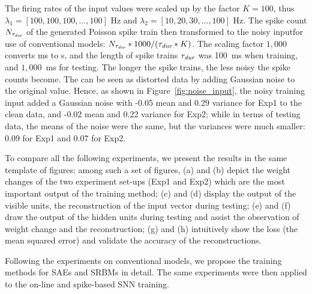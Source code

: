 The firing rates of the input values were scaled up by the factor $K = 100$, thus $\lambda_1 = [100, 100, 100, ..., 100]$ Hz and $\lambda_2 = [10, 20, 30, ..., 100]$ Hz.
The spike count $N_{\tau_{\textit{\textrm{dur}}}}$ of the generated Poisson spike train then transformed to the noisy input\DIFaddbegin {}\DIFaddend for use of conventional models: $N_{\tau_{\textit{\textrm{dur}}}}*1000/(\tau_{\textit{\textrm{dur}}} * K)$.
The scaling factor $1,000$ converts ms to s, and the length of spike trains $\tau_{\textit{\textrm{dur}}}$ was 100~ms when training, and $1,000$~ms for testing.
The longer the spike trains, the less noisy the spike counts become.
The \DIFdelbegin {}\DIFdelend \DIFaddbegin {}\DIFaddend can be seen as distorted data by adding Gaussian noise to the original value.
Hence, as shown in Figure~\ref{fig:noise_input}, the noisy training input added a Gaussian noise with -0.05 mean and 0.29 variance for Exp1 to the clean data, and -0.02 mean and 0.22 variance for Exp2;
while in terms of testing data, the means of the noise were the same, but the variances were much smaller: 0.09 for Exp1 and 0.07 for Exp2.


To compare all the following experiments, we present the results in the same template of figures:
among such a set of figures, (a) and (b) depict the weight changes of the two experiment set-ups (Exp1 and Exp2) which are the most important output of the training method;
(c) and (d) display the output of the visible units, the reconstruction of the input vector during testing;
(e) and (f) draw the output of the hidden units during testing and assist the observation of weight change and the reconstruction;
(g) and (h) intuitively show the loss (the mean squared error) and validate the accuracy of the reconstructions.

Following the experiments on conventional models, we propose the training methods for SAEs and SRBMs in detail.
The same experiments were then applied to the on-line and spike-based SNN training.

